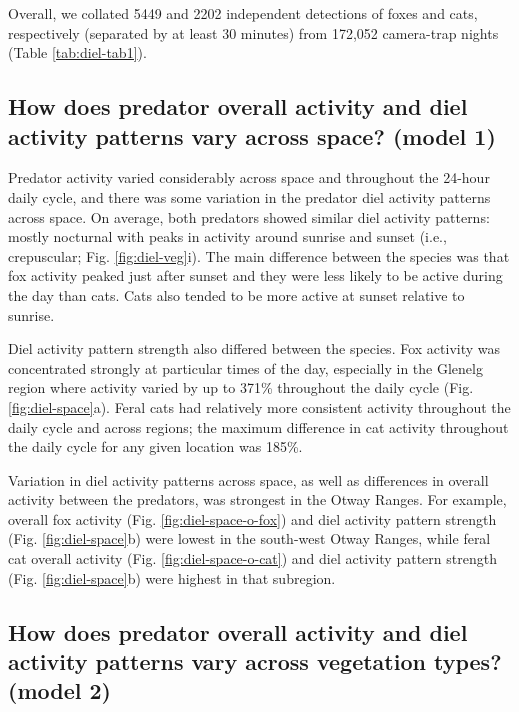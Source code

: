 \documentclass[11pt,a4paper,titlepage,twoside,openright]{style/unimelbthesis}
\begin{document}
\begin{mainmatter}
Overall, we collated 5449 and 2202 independent detections of foxes and cats, respectively (separated by at least 30 minutes) from 172,052 camera-trap nights (Table \ref{tab:diel-tab1}).

\hypertarget{how-does-predator-overall-activity-and-diel-activity-patterns-vary-across-space-model-1-1}{%
\subsection{How does predator overall activity and diel activity patterns vary across space? (model 1)}\label{how-does-predator-overall-activity-and-diel-activity-patterns-vary-across-space-model-1-1}}

Predator activity varied considerably across space and throughout the 24-hour daily cycle, and there was some variation in the predator diel activity patterns across space. On average, both predators showed similar diel activity patterns: mostly nocturnal with peaks in activity around sunrise and sunset (i.e., crepuscular; Fig. \ref{fig:diel-veg}i). The main difference between the species was that fox activity peaked just after sunset and they were less likely to be active during the day than cats. Cats also tended to be more active at sunset relative to sunrise.

Diel activity pattern strength also differed between the species. Fox activity was concentrated strongly at particular times of the day, especially in the Glenelg region where activity varied by up to 371\% throughout the daily cycle (Fig. \ref{fig:diel-space}a). Feral cats had relatively more consistent activity throughout the daily cycle and across regions; the maximum difference in cat activity throughout the daily cycle for any given location was 185\%.

Variation in diel activity patterns across space, as well as differences in overall activity between the predators, was strongest in the Otway Ranges. For example, overall fox activity (Fig. \ref{fig:diel-space-o-fox}) and diel activity pattern strength (Fig. \ref{fig:diel-space}b) were lowest in the south-west Otway Ranges, while feral cat overall activity (Fig. \ref{fig:diel-space-o-cat}) and diel activity pattern strength (Fig. \ref{fig:diel-space}b) were highest in that subregion.

\hypertarget{how-does-predator-overall-activity-and-diel-activity-patterns-vary-across-vegetation-types-model-2-1}{%
\subsection{How does predator overall activity and diel activity patterns vary across vegetation types? (model 2)}\label{how-does-predator-overall-activity-and-diel-activity-patterns-vary-across-vegetation-types-model-2-1}}


\end{mainmatter}
\end{document}
